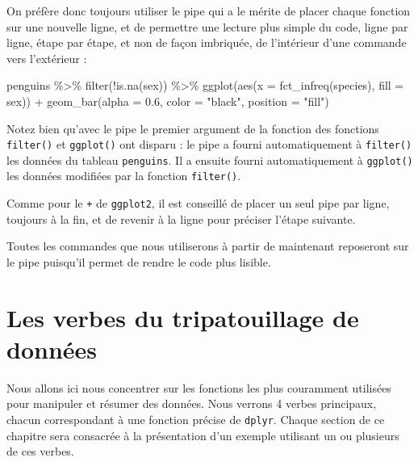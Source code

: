 \documentclass[
  letterpaper,
  DIV=11,
  numbers=noendperiod]{scrreprt}
\newenvironment{Shaded}{\begin{snugshade}}{\end{snugshade}}
\newcommand{\AttributeTok}[1]{\textcolor[rgb]{0.40,0.45,0.13}{#1}}
\newcommand{\FloatTok}[1]{\textcolor[rgb]{0.68,0.00,0.00}{#1}}
\newcommand{\FunctionTok}[1]{\textcolor[rgb]{0.28,0.35,0.67}{#1}}
\newcommand{\NormalTok}[1]{\textcolor[rgb]{0.00,0.23,0.31}{#1}}
\newcommand{\SpecialCharTok}[1]{\textcolor[rgb]{0.37,0.37,0.37}{#1}}
\newcommand{\StringTok}[1]{\textcolor[rgb]{0.13,0.47,0.30}{#1}}
\begin{document}
On préfère donc toujours utiliser le pipe qui a le mérite de placer
chaque fonction sur une nouvelle ligne, et de permettre une lecture plus
simple du code, ligne par ligne, étape par étape, et non de façon
imbriquée, de l'intérieur d'une commande vers l'extérieur :

\begin{Shaded}
\begin{Highlighting}[]
\NormalTok{penguins }\SpecialCharTok{\%\textgreater{}\%} 
  \FunctionTok{filter}\NormalTok{(}\SpecialCharTok{!}\FunctionTok{is.na}\NormalTok{(sex)) }\SpecialCharTok{\%\textgreater{}\%} 
  \FunctionTok{ggplot}\NormalTok{(}\FunctionTok{aes}\NormalTok{(}\AttributeTok{x =} \FunctionTok{fct\_infreq}\NormalTok{(species), }\AttributeTok{fill =}\NormalTok{ sex)) }\SpecialCharTok{+}
  \FunctionTok{geom\_bar}\NormalTok{(}\AttributeTok{alpha =} \FloatTok{0.6}\NormalTok{, }\AttributeTok{color =} \StringTok{"black"}\NormalTok{, }\AttributeTok{position =} \StringTok{"fill"}\NormalTok{)}
\end{Highlighting}
\end{Shaded}

Notez bien qu'avec le pipe le premier argument de la fonction des
fonctions \texttt{filter()} et \texttt{ggplot()} ont disparu : le pipe a
fourni automatiquement à \texttt{filter()} les données du tableau
\texttt{penguins}. Il a ensuite fourni automatiquement à
\texttt{ggplot()} les données modifiées par la fonction
\texttt{filter()}.

Comme pour le \texttt{+} de \texttt{ggplot2}, il est conseillé de placer
un seul pipe par ligne, toujours à la fin, et de revenir à la ligne pour
préciser l'étape suivante.

Toutes les commandes que nous utiliserons à partir de maintenant
reposeront sur le pipe puisqu'il permet de rendre le code plus lisible.

\hypertarget{les-verbes-du-tripatouillage-de-donnuxe9es}{%
\section{Les verbes du tripatouillage de
données}\label{les-verbes-du-tripatouillage-de-donnuxe9es}}

Nous allons ici nous concentrer sur les fonctions les plus couramment
utilisées pour manipuler et résumer des données. Nous verrons 4 verbes
principaux, chacun correspondant à une fonction précise de
\texttt{dplyr}. Chaque section de ce chapitre sera consacrée à la
présentation d'un exemple utilisant un ou plusieurs de ces verbes.
\end{document}
